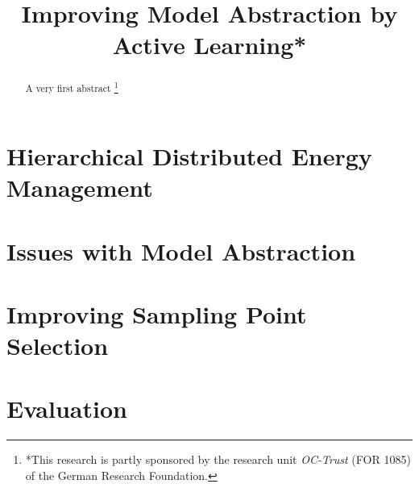 \documentclass[conference]{IEEEtran}
\newcommand{\noteg}[1]{\sethlcolor{highlightgreen} \hl{\textbf{NOTE:} #1}}
\newcommand\blfootnote[1]{%
  \begingroup
  \renewcommand\thefootnote{}\footnote{#1}%
  \addtocounter{footnote}{-1}%
  \endgroup
}
\begin{document}
\title{Improving Model Abstraction by Active Learning*}

\author{
}

\maketitle



\begin{abstract}
A very first abstract
\blfootnote{*This research is partly sponsored by the research unit \emph{OC-Trust} (FOR 1085) of the German Research Foundation.}
\end{abstract}


\section{Hierarchical Distributed Energy Management}

\section{Issues with Model Abstraction}

\section{Improving Sampling Point Selection}

\section{Evaluation}



\end{document}
